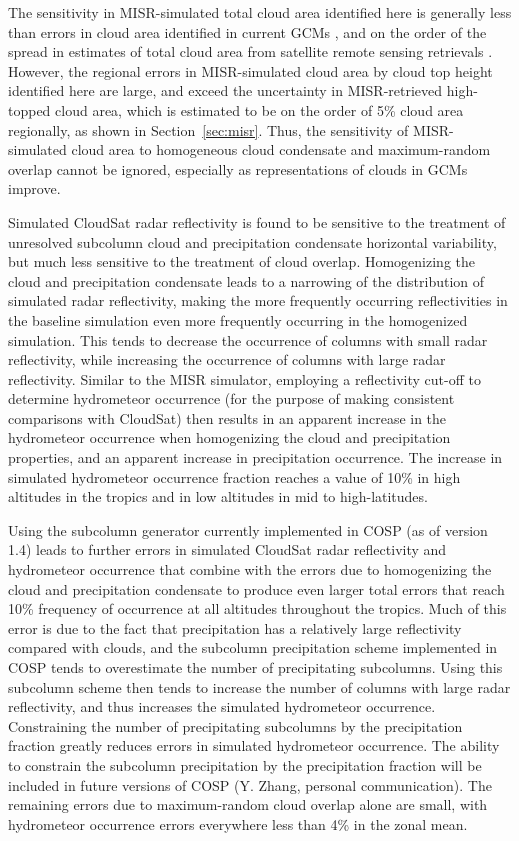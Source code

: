 The sensitivity in MISR-simulated total cloud area identified here is
generally less than errors in cloud area identified in current GCMs
\citep{kay_et_al_2012, klein_et_al_2013, bodas-salcedo_et_al_2011}, and
on the order of the spread in estimates of total cloud area from
satellite remote sensing retrievals
\citep{marchand_et_al_2010, pincus_et_al_2012}. However, the regional
errors in MISR-simulated cloud area by cloud top height identified here
are large, and exceed the uncertainty in MISR-retrieved high-topped
cloud area, which is estimated to be on the order of 5\% cloud area
regionally, as shown in Section~\ref{sec:misr}. Thus, the sensitivity of
MISR-simulated cloud area to homogeneous cloud condensate and
maximum-random overlap cannot be ignored, especially as representations
of clouds in GCMs improve.

Simulated CloudSat radar reflectivity is found to be sensitive to the
treatment of unresolved subcolumn cloud and precipitation condensate
horizontal variability, but much less sensitive to the treatment of
cloud overlap. Homogenizing the cloud and precipitation condensate leads
to a narrowing of the distribution of simulated radar reflectivity,
making the more frequently occurring reflectivities in the baseline
simulation even more frequently occurring in the homogenized simulation.
This tends to decrease the occurrence of columns with small radar
reflectivity, while increasing the occurrence of columns with large
radar reflectivity. Similar to the MISR simulator, employing a
reflectivity cut-off to determine hydrometeor occurrence (for the
purpose of making consistent comparisons with CloudSat) then results in
an apparent increase in the hydrometeor occurrence when homogenizing the
cloud and precipitation properties, and an apparent increase in
precipitation occurrence. The increase in simulated hydrometeor
occurrence fraction reaches a value of 10\% in high altitudes in the
tropics and in low altitudes in mid to high-latitudes.

Using the subcolumn generator currently implemented in COSP (as of
version 1.4) leads to further errors in simulated CloudSat radar
reflectivity and hydrometeor occurrence that combine with the errors due
to homogenizing the cloud and precipitation condensate to produce even
larger total errors that reach 10\% frequency of occurrence at all
altitudes throughout the tropics. Much of this error is due to the fact
that precipitation has a relatively large reflectivity compared with
clouds, and the subcolumn precipitation scheme implemented in COSP tends
to overestimate the number of precipitating subcolumns. Using this
subcolumn scheme then tends to increase the number of columns with large
radar reflectivity, and thus increases the simulated hydrometeor
occurrence. Constraining the number of precipitating subcolumns by the
precipitation fraction greatly reduces errors in simulated hydrometeor
occurrence. The ability to constrain the subcolumn precipitation by the
precipitation fraction will be included in future versions of COSP (Y.
Zhang, personal communication). The remaining errors due to
maximum-random cloud overlap alone are small, with hydrometeor
occurrence errors everywhere less than 4\% in the zonal mean.

